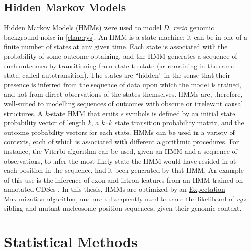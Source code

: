 \subsection{Hidden Markov Models}
\label{ssec:HMM}
Hidden Markov Models (HMMs) were used to model \textit{D. rerio} genomic background noise in \autoref{chap:rys}. An HMM is a state machine; it can be in one of a finite number of states at any given time. Each state is associated with the probability of some outcome obtaining, and the HMM generates a sequence of such outcomes by transitioning from state to state (or remaining in the same state, called autotransition). The states are ``hidden'' in the sense that their presence is inferred from the sequence of data upon which the model is trained, and not from direct observations of the states themselves. HMMs are, therefore, well-suited to modelling sequences of outcomes with obscure or irrelevant causal structures. A $k$-state HMM that emits $s$ symbols is defined by an initial state probability vector of length $k$, a $k\cdot k$ state transition probability matrix, and the outcome probability vectors for each state. HMMs can be used in a variety of contexts, each of which is associated with different algorithmic procedures. For instance, the Viterbi algorithm can be used, given an HMM and a sequence of observations, to infer the most likely state the HMM would have resided in at each position in the sequence, had it been generated by that HMM. An example of this use is the inference of exon and intron features from an HMM trained on annotated CDSes \cite{Henderson1997}. In this thesis, HMMs are optimized by an \hyperref[ssec:EM]{Expectation Maximization} algorithm, and are subsequently used to score the likelihood of \textit{rys} sibling and mutant nucleosome position sequences, given their genomic context.

\section{Statistical Methods}


